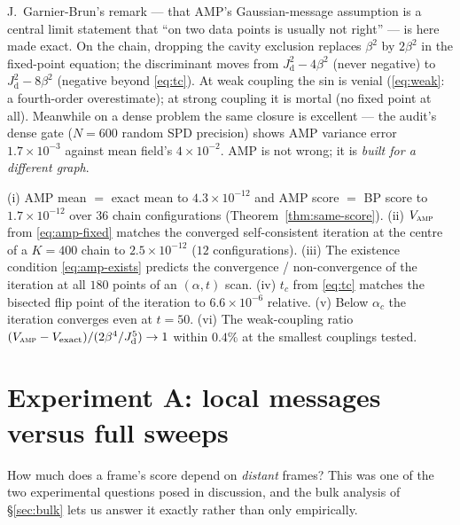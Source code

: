 \documentclass[11pt]{article}
\theoremstyle{definition}
\newcommand{\Jd}{J_{\mathrm d}}
\begin{document}
\begin{intuition}
J.~Garnier-Brun's remark --- that AMP's Gaussian-message assumption is a
central limit statement that ``on two data points is usually not right'' ---
is here made exact. On the chain, dropping the cavity exclusion replaces
$\beta^2$ by $2\beta^2$ in the fixed-point equation; the discriminant moves
from $\Jd^2-4\beta^2$ (never negative) to $\Jd^2-8\beta^2$ (negative beyond
\eqref{eq:tc}). At weak coupling the sin is venial
(\eqref{eq:weak}: a fourth-order overestimate); at strong coupling it is
mortal (no fixed point at all). Meanwhile on a dense problem the same closure
is excellent --- the audit's dense gate ($N=600$ random SPD precision) shows
AMP variance error $1.7\times10^{-3}$ against mean field's $4\times10^{-2}$.
AMP is not wrong; it is \emph{built for a different graph}.
\end{intuition}

\begin{auditbox}
(i) AMP mean $=$ exact mean to $4.3\times10^{-12}$ and AMP score $=$ BP score
to $1.7\times10^{-12}$ over $36$ chain configurations
(Theorem~\ref{thm:same-score}). (ii) $V_{\textsc{amp}}$ from
\eqref{eq:amp-fixed} matches the converged self-consistent iteration at the
centre of a $K=400$ chain to $2.5\times10^{-12}$ ($12$ configurations).
(iii) The existence condition \eqref{eq:amp-exists} predicts the convergence
/ non-convergence of the iteration at all $180$ points of an $(\alpha,t)$
scan. (iv) $t_c$ from \eqref{eq:tc} matches the bisected flip point of the
iteration to $6.6\times10^{-6}$ relative. (v) Below $\alpha_c$ the iteration
converges even at $t=50$. (vi) The weak-coupling ratio
$(V_{\textsc{amp}}-V_{\mathrm{exact}})/(2\beta^4/\Jd^5)\to1$ within
$0.4\%$ at the smallest couplings tested.
\end{auditbox}

\section{Experiment A: local messages versus full sweeps}\label{sec:expA}

How much does a frame's score depend on \emph{distant} frames? This was one of
the two experimental questions posed in discussion, and the bulk analysis of
\S\ref{sec:bulk} lets us answer it exactly rather than only empirically.
\end{document}

